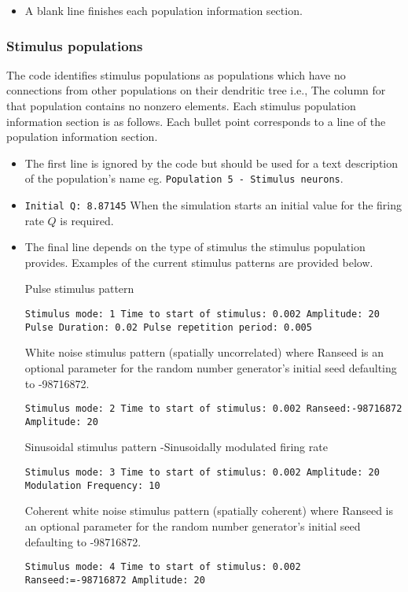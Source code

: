 \documentclass[12pt,a4paper]{article}
\begin{document}
\begin{itemize}
{\tt \small Dendritic Response from population 3 V initial: Steady alpha: 75.0 beta: 285.0}.

The ``Steady" short hand feature cannot be used if any of the coupling described
later in this document are of the ModCouple type.

\item A blank line finishes each population information section.
\end{itemize}

\subsubsection{Stimulus populations}
The code identifies stimulus populations as populations which have no 
connections from other populations on their dendritic tree i.e.,
The column for that population contains no nonzero elements.
Each stimulus population information section is as follows. Each bullet point
corresponds to a line of the population information section.
\begin{itemize}
\item The first line is ignored by the code but should be used for
a text description of the population's name eg. 
{\tt \small Population 5 - Stimulus neurons}.
\item {\tt \small Initial Q: 8.87145} When the simulation starts an initial
value for the firing rate $Q$ is required.
\item The final line depends on the type of stimulus the stimulus population
provides. Examples of the current stimulus patterns are provided below.

Pulse stimulus pattern

{\tt \small Stimulus mode: 1 Time to start of stimulus: 0.002 Amplitude: 20
Pulse Duration: 0.02 Pulse repetition period: 0.005}

White noise stimulus pattern (spatially uncorrelated) where Ranseed
is an optional parameter for the random number generator's initial seed defaulting to -98716872.

{\tt \small Stimulus mode: 2 Time to start of stimulus: 0.002 Ranseed:-98716872 Amplitude: 20}

Sinusoidal stimulus pattern -Sinusoidally modulated firing rate

{\tt \small Stimulus mode: 3 Time to start of stimulus: 0.002 Amplitude: 20
Modulation Frequency: 10}

Coherent white noise stimulus pattern (spatially coherent) where Ranseed
is an optional parameter for the random number generator's initial seed defaulting to -98716872.

{\tt \small Stimulus mode: 4 Time to start of stimulus: 0.002 Ranseed:=-98716872 Amplitude: 20}
\end{itemize}
\end{document}
